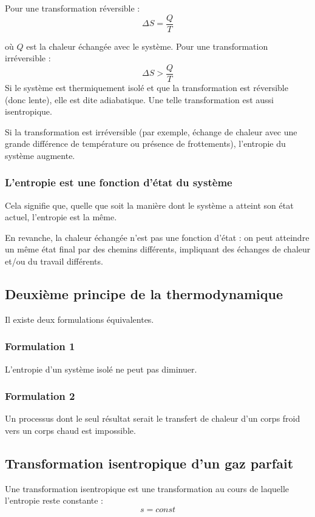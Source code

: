 \documentclass[11pt]{article}
\begin{document}
	Pour une transformation réversible :
	\begin{equation}
		\Delta S = \frac{Q}{T} 
	\end{equation}
	
	où $Q$ est la chaleur échangée avec le système.
	Pour une transformation irréversible :
	\begin{equation}
		\Delta S > \frac{Q}{T} 
	\end{equation}
	Si le système est thermiquement isolé et que la transformation est réversible (donc lente), elle est dite adiabatique. Une telle transformation est aussi isentropique.
	
	Si la transformation est irréversible (par exemple, échange de chaleur avec une grande différence de température ou présence de frottements), l’entropie du système augmente.
	\subsubsection*{L’entropie est une fonction d’état du système}
	
	Cela signifie que, quelle que soit la manière dont le système a atteint son état actuel, l’entropie est la même.
	
	En revanche, la chaleur échangée n’est pas une fonction d’état : on peut atteindre un même état final par des chemins différents, impliquant des échanges de chaleur et/ou du travail différents.
	\subsection*{Deuxième principe de la thermodynamique}  
	Il existe deux formulations équivalentes.
	
	\subsubsection*{Formulation 1}
	L’entropie d’un système isolé ne peut pas diminuer.
	
	\subsubsection*{Formulation 2}
	Un processus dont le seul résultat serait le transfert de chaleur d’un corps froid vers un corps chaud est impossible.
	
	\subsection*{Transformation isentropique d'un gaz parfait}
	Une transformation isentropique est une transformation au cours de laquelle l'entropie reste constante :
	\[
	s =  const 
	\]
	
\end{document}
